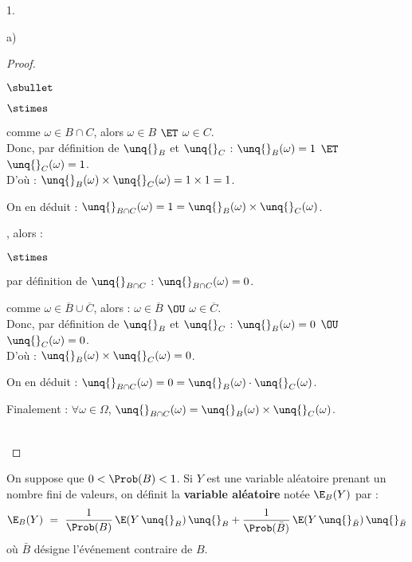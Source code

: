 \documentclass[11pt]{article}%
\begin{document}
\begin{noliste}{1.}
\begin{noliste}{a)}
\begin{proof}
\begin{noliste}{$\sbullet$}
\begin{noliste}{$\stimes$}
	  \item comme $\omega \in B \cap C$, alors $\omega \in B$
	  $\ET$ $\omega \in C$.\\
	  Donc, par définition de $\unq{}_B$ et $\unq{}_C$ : 
	  $\unq{}_B(\omega) =1 $ $\ET$ $\unq{}_C(\omega)=1$.\\
	  D'où : $\unq{}_B(\omega) \times \unq{}_C(\omega) = 1 \times
	  1 = 1$.
	\end{noliste}
	On en déduit : $\unq{}_{B \cap C}(\omega) = 1 = 
	\unq{}_B(\omega) \times \unq{}_C(\omega)$.
	
	\item {}, alors :
	\begin{noliste}{$\stimes$}
	  \item par définition de $\unq{}_{B \cap C}$ : 
	  $\unq{}_{B \cap C}(\omega)=0$.
	  
	  \item comme $\omega \in \overline{B} \cup \overline{C}$, 
	  alors :
	  $\omega \in \overline{B}$ $\OU$ $\omega \in \overline{C}$.\\
	  Donc, par définition de $\unq{}_B$ et $\unq{}_C$ : 
	  $\unq{}_B(\omega) =0$ $\OU$ $\unq{}_C(\omega)=0$.\\
	  D'où : $\unq{}_B(\omega) \times \unq{}_C(\omega) =0$.
	\end{noliste}
	On en déduit : $\unq{}_{B\cap C}(\omega) = 0 = \unq{}_B
	(\omega) \cdot \unq{}_C(\omega)$.
      \end{noliste}
      Finalement : $\forall \omega \in \Omega$, $\unq{}_{B\cap C} 
      (\omega) = \unq{}_B(\omega) \times \unq{}_C(\omega)$.
      
      
      
      
      ~\\[-1.4cm]
    \end{proof}
    
    \item On suppose que $0 < \Prob(B) < 1$. Si $Y$ est une variable
    aléatoire prenant un nombre fini de valeurs, on définit la {\bf 
    variable aléatoire} notée $\E_B(Y)$ par :
    \[
      \E_B(Y) \ = \ \dfrac{1}{\Prob(B)} \, \E(Y \, \unq{}_B) \, 
      \unq{}_B + \dfrac{1}{\Prob(\bar{B})} \, \E(Y \, \unq{}_{\bar{B}})
      \, \unq{}_{\bar{B}}
    \]
    où $\bar{B}$ désigne l'événement contraire de $B$.
    
    
    

\end{noliste}
\end{noliste}
\end{document}
